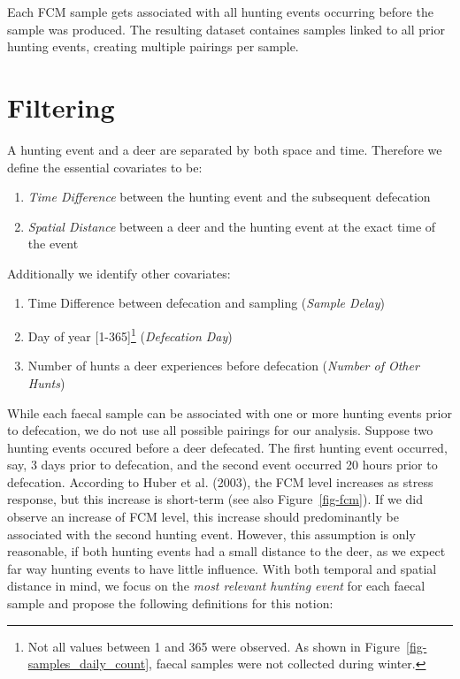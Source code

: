 \documentclass[
  letterpaper,
  DIV=11,
  numbers=noendperiod,
  twocolumn,
  open=any]{scrreprt}
\providecommand{\tightlist}{%
  \setlength{\itemsep}{0pt}\setlength{\parskip}{0pt}}\usepackage{longtable,booktabs,array}
\begin{document}
Each FCM sample gets associated with all hunting events occurring before
the sample was produced. The resulting dataset containes samples linked
to all prior hunting events, creating multiple pairings per sample.

\section{Filtering}\label{sec-filtering}

A hunting event and a deer are separated by both space and time.
Therefore we define the essential covariates to be:

\begin{enumerate}
\def\labelenumi{\roman{enumi})}
\tightlist
\item
  \emph{Time Difference} between the hunting event and the subsequent
  defecation
\item
  \emph{Spatial Distance} between a deer and the hunting event at the
  exact time of the event
\end{enumerate}

Additionally we identify other covariates:

\begin{enumerate}
\def\labelenumi{\roman{enumi})}
\setcounter{enumi}{2}
\tightlist
\item
  Time Difference between defecation and sampling (\emph{Sample Delay})
\item
  Day of year {[}1-365{]}\footnote{Not all values between 1 and 365 were
    observed. As shown in Figure~\ref{fig-samples_daily_count}, faecal
    samples were not collected during winter.} (\emph{Defecation Day})
\item
  Number of hunts a deer experiences before defecation (\emph{Number of
  Other Hunts})
\end{enumerate}

While each faecal sample can be associated with one or more hunting
events prior to defecation, we do not use all possible pairings for our
analysis. Suppose two hunting events occured before a deer defecated.
The first hunting event occurred, say, 3 days prior to defecation, and
the second event occurred 20 hours prior to defecation. According to
Huber et al. (2003), the FCM level increases as stress response, but
this increase is short-term (see also Figure~\ref{fig-fcm}). If we did
observe an increase of FCM level, this increase should predominantly be
associated with the second hunting event. However, this assumption is
only reasonable, if both hunting events had a small distance to the
deer, as we expect far way hunting events to have little influence. With
both temporal and spatial distance in mind, we focus on the \emph{most
relevant hunting event} for each faecal sample and propose the following
definitions for this notion:
\end{document}
